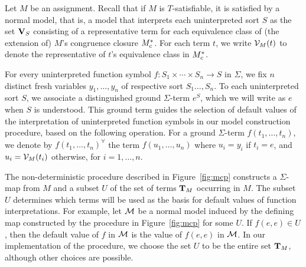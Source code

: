 \documentclass{svjour3}                     %
\begin{document}
Let $M$ be an assignment.
Recall that if $M$ is $T$-satisfiable,
it is satisfied by a normal model, that is, a model that interprets each uninterpreted sort $S$ 
as the set $\mathbf{V}_S$ consisting of a representative term for each equivalence class of 
(the extension of) $M$'s congruence closure $M^{*}_{c}$.
For each term $t$, 
we write $\mathcal{V}_{M}(t)$ to denote the representative of
$t$'s equivalence class in $M^{*}_{c}$.

For every uninterpreted function symbol 
$f : S_1 \times \cdots \times S_n \rightarrow S$ in $\Sigma$,
we fix $n$ distinct fresh variables $y_1, \ldots, y_n$ of respective sort 
$S_1 \ldots, S_n$.
To each uninterpreted sort $S$, we associate a distinguished ground $\Sigma$-term $e^S$,
which we will write as $e$ when $S$ is understood.
This ground term guides the selection of default values of the interpretation of 
uninterpreted function symbols in our model construction procedure, 
based on the following operation.
For a ground $\Sigma$-term $f(t_1, \ldots, t_n)$, 
we denote by $f( t_1, \ldots, t_n )^\forall$ 
the term $f( u_1, \ldots, u_n )$
where $u_i = y_i$ if $t_i = e$, and 
$u_i = \mathcal{V}_{M}(t_i)$ otherwise, for $i=1, \ldots, n$.
\medskip

The non-deterministic procedure described in Figure~\ref{fig:mcp}
constructs a $\Sigma$-map from $M$ and a subset $U$ of the set of terms $\mathbf{T}_{M}$ occurring in $M$.
The subset $U$ determines which terms will be used as the basis for default values
of function interpretations. 
For example, let $\mathcal{M}$ be a normal model induced by the defining map
constructed by the procedure in Figure~\ref{fig:mcp} for some $U$. 
If $f( e, e ) \in U$, then
the default value of $f$ in $\mathcal{M}$ is the value of $f( e, e )$ in $\mathcal{M}$.
In our implementation of the procedure, we choose the set $U$ to be
the entire set $\mathbf{T}_{M}$, although other choices are possible.
\end{document}

